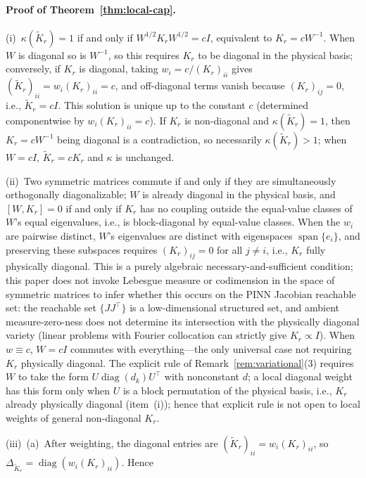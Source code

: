 \documentclass[11pt]{article}
\newcommand{\W}{W}
\DeclareMathOperator{\diag}{diag}
\DeclareMathOperator{\spanop}{span}
\numberwithin{equation}{section}
\begin{document}
\paragraph{Proof of Theorem~\ref{thm:local-cap}.}
\par\noindent(i)~$\kappa(\widetilde K_r)=1$ if and only if $\W^{1/2}K_r\W^{1/2}=cI$, equivalent to $K_r=c\W^{-1}$. When $\W$ is diagonal so is $\W^{-1}$, so this requires $K_r$ to be diagonal in the physical basis; conversely, if $K_r$ is diagonal, taking $w_i=c/(K_r)_{ii}$ gives $(\widetilde K_r)_{ii}=w_i(K_r)_{ii}=c$, and off-diagonal terms vanish because $(K_r)_{ij}=0$, i.e., $\widetilde K_r=cI$. This solution is unique up to the constant $c$ (determined componentwise by $w_i(K_r)_{ii}=c$). If $K_r$ is non-diagonal and $\kappa(\widetilde K_r)=1$, then $K_r=c\W^{-1}$ being diagonal is a contradiction, so necessarily $\kappa(\widetilde K_r)>1$; when $\W=cI$, $\widetilde K_r=cK_r$ and $\kappa$ is unchanged.
\par\noindent(ii)~Two symmetric matrices commute if and only if they are simultaneously orthogonally diagonalizable; $\W$ is already diagonal in the physical basis, and $[\W,K_r]=0$ if and only if $K_r$ has no coupling outside the equal-value classes of $\W$'s equal eigenvalues, i.e., is block-diagonal by equal-value classes. When the $w_i$ are pairwise distinct, $\W$'s eigenvalues are distinct with eigenspaces $\spanop\{e_i\}$, and preserving these subspaces requires $(K_r)_{ij}=0$ for all $j\ne i$, i.e., $K_r$ fully physically diagonal. This is a purely algebraic necessary-and-sufficient condition; this paper does not invoke Lebesgue measure or codimension in the space of symmetric matrices to infer whether this occurs on the PINN Jacobian reachable set: the reachable set $\{JJ^\top\}$ is a low-dimensional structured set, and ambient measure-zero-ness does not determine its intersection with the physically diagonal variety (linear problems with Fourier collocation can strictly give $K_r\propto I$). When $w\equiv c$, $\W=cI$ commutes with everything---the only universal case not requiring $K_r$ physically diagonal. The explicit rule of Remark~\ref{rem:variational}(3) requires $\W$ to take the form $U\diag(d_k)U^\top$ with nonconstant $d$; a local diagonal weight has this form only when $U$ is a block permutation of the physical basis, i.e., $K_r$ already physically diagonal (item~(i)); hence that explicit rule is not open to local weights of general non-diagonal $K_r$.
\par\noindent(iii)~(a)~After weighting, the diagonal entries are $(\widetilde K_r)_{ii}=w_i(K_r)_{ii}$, so $\Delta_{\widetilde K_r}=\diag(w_i(K_r)_{ii})$. Hence
\end{document}
